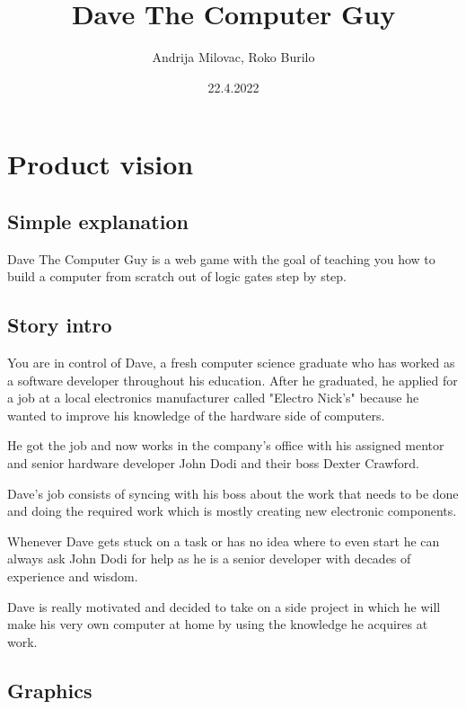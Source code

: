 \documentclass[12pt]{article}
\author{Andrija Milovac, Roko Burilo}
\title{Dave The Computer Guy}
\date{22.4.2022}
\begin{document}
\maketitle
\tableofcontents
\section{Product vision}
\subsection{Simple explanation}
Dave The Computer Guy is a web game with the goal of teaching you how to build a computer from scratch out of logic gates step by step.
\subsection{Story intro}

You are in control of Dave, a fresh computer science graduate who has worked as a software developer throughout his education.
After he graduated, he applied for a job at a local electronics manufacturer called "Electro Nick's" because he wanted to 
improve his knowledge of the hardware side of computers.

He got the job and now works in the company's office with his assigned mentor and senior hardware developer John Dodi and their boss Dexter Crawford.

Dave's job consists of syncing with his boss about the work that needs to be done and doing the required work which is mostly
creating new electronic components.

Whenever Dave gets stuck on a task or has no idea where to even start he can always ask John Dodi for help as he is a senior developer with
decades of experience and wisdom.

Dave is really motivated and decided to take on a side project in which he will make his very own computer at home by using the knowledge 
he acquires at work.
\subsection{Graphics}
\end{document}
